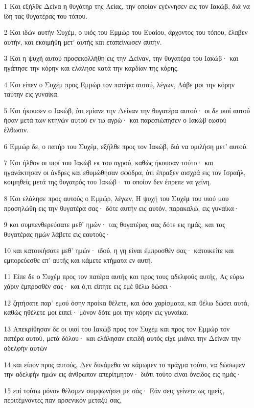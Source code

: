 \par 1 Και εξήλθε Δείνα η θυγάτηρ της Λείας, την οποίαν εγέννησεν εις τον Ιακώβ, διά να ίδη τας θυγατέρας του τόπου.
\par 2 Και ιδών αυτήν Συχέμ, ο υιός του Εμμώρ του Ευαίου, άρχοντος του τόπου, έλαβεν αυτήν, και εκοιμήθη μετ' αυτής και εταπείνωσεν αυτήν.
\par 3 Και η ψυχή αυτού προσεκολλήθη εις την Δείναν, την θυγατέρα του Ιακώβ· και ηγάπησε την κόρην και ελάλησε κατά την καρδίαν της κόρης.
\par 4 Και είπεν ο Συχέμ προς Εμμώρ τον πατέρα αυτού, λέγων, Λάβε μοι την κόρην ταύτην εις γυναίκα.
\par 5 Και ήκουσεν ο Ιακώβ, ότι εμίανε την Δείναν την θυγατέρα αυτού· οι δε υιοί αυτού ήσαν μετά των κτηνών αυτού εν τω αγρώ· και παρεσιώπησεν ο Ιακώβ εωσού έλθωσιν.
\par 6 Εμμώρ δε, ο πατήρ του Συχέμ, εξήλθε προς τον Ιακώβ, διά να ομιλήση μετ' αυτού.
\par 7 Και ήλθον οι υιοί του Ιακώβ εκ του αγρού, καθώς ήκουσαν τούτο· και ηγανάκτησαν οι άνδρες και εθυμώθησαν σφόδρα, ότι έπραξεν αισχρά εις τον Ισραήλ, κοιμηθείς μετά της θυγατρός του Ιακώβ· το οποίον δεν έπρεπε να γείνη.
\par 8 Και ελάλησε προς αυτούς ο Εμμώρ, λέγων, Η ψυχή του Συχέμ του υιού μου προσηλώθη εις την θυγατέρα σας· δότε αυτήν εις αυτόν, παρακαλώ, εις γυναίκα·
\par 9 και συμπενθερεύσατε μεθ' ημών· τας θυγατέρας σας δότε εις ημάς, και τας θυγατέρας ημών λάβετε εις εαυτούς·
\par 10 και κατοικήσατε μεθ' ημών· ιδού, η γη είναι έμπροσθέν σας· κατοικείτε και εμπορεύεσθε επ' αυτής και κάμετε κτήματα εν αυτή.
\par 11 Είπε δε ο Συχέμ προς τον πατέρα αυτής και προς τους αδελφούς αυτής, Ας εύρω χάριν έμπροσθέν σας· και ό,τι είπητε εις εμέ θέλω δώσει·
\par 12 ζητήσατε παρ' εμού όσην προίκα θέλετε, και όσα χαρίσματα, και θέλω δώσει αυτά, καθώς ηθέλετε μοι ειπεί· μόνον δότε μοι την κόρην εις γυναίκα.
\par 13 Απεκρίθησαν δε οι υιοί του Ιακώβ προς τον Συχέμ και προς τον Εμμώρ τον πατέρα αυτού, μετά δόλου· και ελάλησαν επειδή αυτός είχε μιάνει την Δείναν την αδελφήν αυτών
\par 14 και είπον προς αυτούς, Δεν δυνάμεθα να κάμωμεν το πράγμα τούτο, να δώσωμεν την αδελφήν ημών εις άνθρωπον απερίτμητον· διότι τούτο είναι όνειδος εις ημάς·
\par 15 επί τούτω μόνον θέλομεν συμφωνήσει με σάς· Εάν σεις γείνετε ως ημείς, περιτέμνοντες παν αρσενικόν μεταξύ σας,
